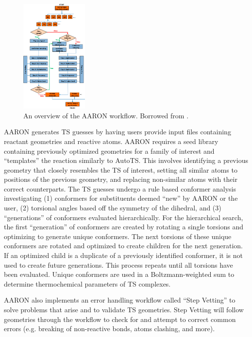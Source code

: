 \documentclass[preprint, 11pt]{elsarticle} %
\begin{document}
\begin{figure}[htbp]
    \centering
    \includegraphics[width=0.3\textwidth]{aaron_workflow}
    \caption{An overview of the AARON workflow. Borrowed from \cite{Guan:2018}.}
    \label{fig:aaron_workflow}
\end{figure}

AARON generates TS guesses by having users provide input files containing reactant geometries and reactive atoms.
AARON requires a seed library containing previously optimized geometries for a family of interest and ``templates'' the reaction similarly to AutoTS.
This involves identifying a previous geometry that closely resembles the TS of interest, setting all similar atoms to positions of the previous geometry, and replacing non-similar atoms with their correct counterparts.
The TS guesses undergo a rule based conformer analysis investigating (1) conformers for substituents deemed ``new'' by AARON or the user, (2) torsional angles based off the symmetry of the dihedral, and (3) ``generations'' of conformers evaluated hierarchically.
For the hierarchical search, the first ``generation'' of conformers are created by rotating a single torsions and optimizing to generate unique conformers.
The next torsions of these unique conformers are rotated and optimized to create children for the next generation. 
If an optimized child is a duplicate of a previously identified conformer, it is not used to create future generations.
This process repeats until all torsions have been evaluated. 
Unique conformers are used in a Boltzmann-weighted sum to determine thermochemical parameters of TS complexes. 

AARON also implements an error handling workflow called ``Step Vetting'' to solve problems that arise and to validate TS geometries.%
Step Vetting will follow geometries through the workflow to check for and attempt to correct common errors (e.g. breaking of non-reactive bonds, atoms clashing, and more).
\end{document}
